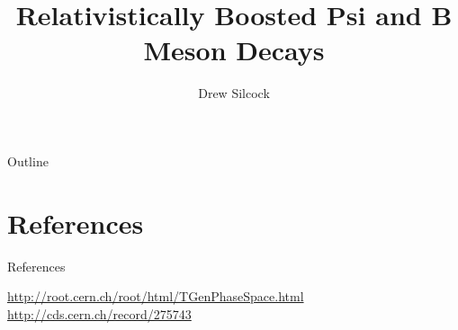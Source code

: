 \documentclass[]{beamer}
\title[]{Relativistically Boosted Psi and B Meson Decays}
\author{Drew Silcock}
\institute{University of Bristol}
\date{\displaydate{presentation}}
\begin{document}
\begin{frame}
    \titlepage
\end{frame}

\begin{frame}{Outline}
    \tableofcontents[]
\end{frame}









\section{References}

\begin{frame}{References}
\begin{itemize}
    \Item \url{http://root.cern.ch/root/html/TGenPhaseSpace.html}
    \Item \url{http://cds.cern.ch/record/275743}
\end{itemize}
\end{frame}
\end{document}
